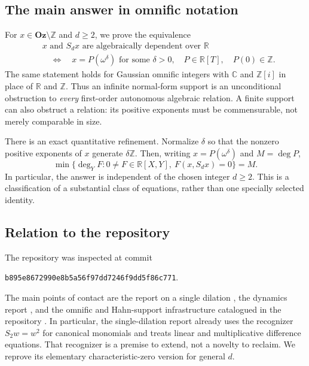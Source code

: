 \documentclass[11pt,letterpaper]{article}
\numberwithin{equation}{section}
\theoremstyle{definition}
\theoremstyle{remark}
\newcommand{\Oz}{\mathbf{Oz}}
\newcommand{\C}{\mathbb C}
\newcommand{\R}{\mathbb R}
\newcommand{\Z}{\mathbb Z}
\begin{document}
\subsection{The main answer in omnific notation}

For $x\in\Oz\setminus\Z$ and $d\ge2$, we prove the equivalence
\begin{equation}\label{adr:eq:headline}
 \begin{split}
 &x\text{ and }S_dx\text{ are algebraically dependent over }\R\\
 &\quad\Longleftrightarrow\quad
 x=P(\omega^\delta)\text{ for some }\delta>0,
 \quad P\in\R[T],\quad P(0)\in\Z.
 \end{split}
\end{equation}
The same statement holds for Gaussian omnific integers with $\C$ and
$\Z[i]$ in place of $\R$ and $\Z$. Thus an infinite normal-form support is
an unconditional obstruction to \emph{every} first-order autonomous
algebraic relation. A finite support can also obstruct a relation: its
positive exponents must be commensurable, not merely comparable in size.

There is an exact quantitative refinement. Normalize $\delta$ so that the
nonzero positive exponents of $x$ generate $\delta\Z$. Then, writing
$x=P(\omega^\delta)$ and $M=\deg P$,
\begin{equation}\label{adr:eq:headline-degree}
 \min\{\deg_YF:0\ne F\in\R[X,Y],\ F(x,S_dx)=0\}=M.
\end{equation}
In particular, the answer is independent of the chosen integer $d\ge2$.
This is a classification of a substantial class of equations, rather than
one specially selected identity.

\subsection{Relation to the repository}

The repository was inspected at commit
\begin{center}\small\texttt{b895e8672990e8b5a56f97dd7246f9dd5f86c771}.\end{center}
The main points of contact are the report on a single dilation
\cite{RepoDilation}, the dynamics report \cite{RepoDynamics}, and the
omnific and Hahn-support infrastructure catalogued in the repository
\cite{Repo}. In particular, the single-dilation report already uses the
recognizer $S_2w=w^2$ for canonical monomials and treats linear and
multiplicative difference equations. That recognizer is a premise to
extend, not a novelty to reclaim. We reprove its elementary
characteristic-zero version for general $d$.
\end{document}
